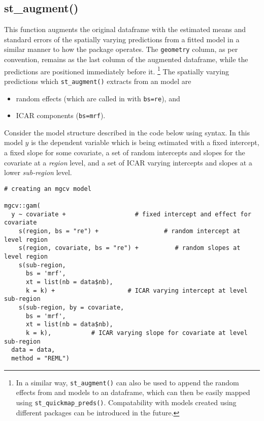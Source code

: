 \subsection{st\_augment()}\label{st_augment}

This function augments the original dataframe with the estimated means
and standard errors of the spatially varying predictions from a fitted  model in a similar manner to
how the  package \citep{broom} operates. The \texttt{geometry} column, as per convention, remains as the last column of the augmented dataframe, while the predictions are positioned immediately before it. \footnote{In a similar way, \texttt{st\_augment()} can also be used to append the random effects from  \citep{lme4} and  \citep{nlme} models to an  dataframe, which can then be easily mapped using \texttt{st\_quickmap\_preds()}. Compatability with models created using different packages can be introduced in the future.} The spatially varying predictions which \texttt{st\_augment()} extracts from an  model are

\begin{itemize}
\tightlist
\item
  random effects (which are called in  with \texttt{bs=\textquotesingle{}re\textquotesingle{}}), and
\item
  ICAR components (\texttt{bs=\textquotesingle{}mrf\textquotesingle{}}).
\end{itemize}

Consider the model structure described in the code below using  syntax. In this model \(y\) is the dependent variable which is being estimated with a fixed intercept, a fixed slope for some covariate, a set of random intercepts and slopes for the covariate at a \emph{region} level, and a set of ICAR varying intercepts and slopes at a lower \emph{sub-region} level.

\begin{verbatim}
# creating an mgcv model

mgcv::gam(
  y ~ covariate +                   # fixed intercept and effect for covariate  
    s(region, bs = "re") +                  # random intercept at level region
    s(region, covariate, bs = "re") +          # random slopes at level region
    s(sub-region, 
      bs = 'mrf',
      xt = list(nb = data$nb), 
      k = k) +                    # ICAR varying intercept at level sub-region
    s(sub-region, by = covariate, 
      bs = 'mrf',
      xt = list(nb = data$nb), 
      k = k),           # ICAR varying slope for covariate at level sub-region
  data = data, 
  method = "REML")
\end{verbatim}

